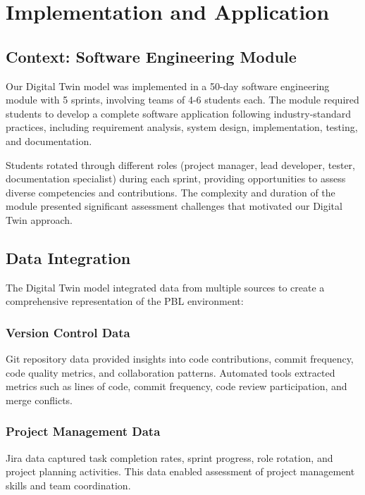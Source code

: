 \documentclass[review]{elsarticle}
\begin{document}
\section{Implementation and Application}
\label{sec:implementation}

\subsection{Context: Software Engineering Module}
\label{sec:context}

Our Digital Twin model was implemented in a 50-day software engineering module with 5 sprints, involving teams of 4-6 students each. The module required students to develop a complete software application following industry-standard practices, including requirement analysis, system design, implementation, testing, and documentation.

Students rotated through different roles (project manager, lead developer, tester, documentation specialist) during each sprint, providing opportunities to assess diverse competencies and contributions. The complexity and duration of the module presented significant assessment challenges that motivated our Digital Twin approach.

\subsection{Data Integration}
\label{sec:data_integration}

The Digital Twin model integrated data from multiple sources to create a comprehensive representation of the PBL environment:

\subsubsection{Version Control Data}
Git repository data provided insights into code contributions, commit frequency, code quality metrics, and collaboration patterns. Automated tools extracted metrics such as lines of code, commit frequency, code review participation, and merge conflicts.

\subsubsection{Project Management Data}
Jira data captured task completion rates, sprint progress, role rotation, and project planning activities. This data enabled assessment of project management skills and team coordination.
\end{document}
